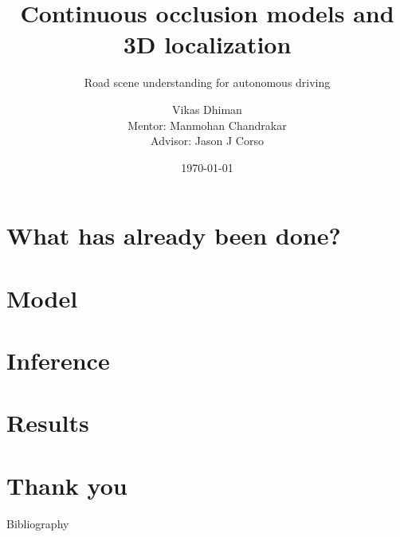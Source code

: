 % 
%

%


\title{Continuous occlusion models and 3D localization}
\subtitle{Road scene understanding for autonomous driving}
\date{\today}
\author{Vikas Dhiman\\ Mentor: Manmohan Chandrakar\\ Advisor: Jason J Corso}

%



\maketitle

\section{What has already been done?}

% 
\section{Model}

% 
\section{Inference}

% 
\section{Results}

% 
\section{Thank you}
\begin{frame}{Bibliography}


\end{frame}


